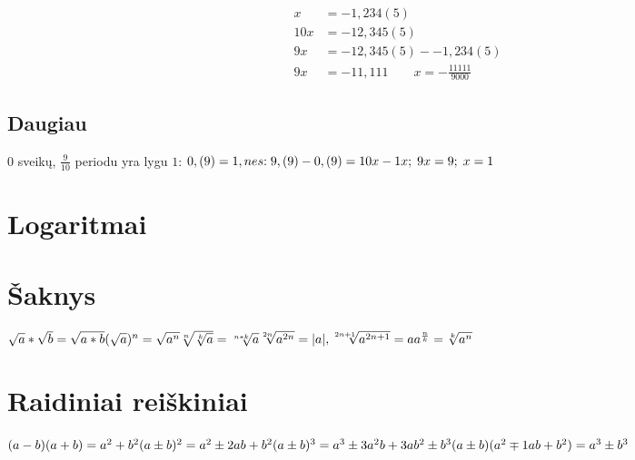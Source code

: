 \documentclass[fleqn]{article} %
\begin{document}
\begin{align*}
    x   &= -1,234(5)              \\
    10x &= -12,345(5)             \\
    9x  &= -12,345(5) - -1,234(5) \\
    9x  &= -11,111  \qquad  x = -\frac{11111}{9000}
\end{align*}  

\subsection{Daugiau}
$0$ sveikų, $\frac{9}{10}$ periodu yra lygu $1$:
\begin{math}\\
    0,(9) = 1, nes{:}\; 9,(9) - 0,(9) = 10x - 1x;\; 9x = 9;\; x = 1
\end{math}

\section{Logaritmai}

% 

\section{Šaknys}

\begin{math}
    \sqrt{a} * \sqrt{b} = \sqrt{a * b} \\
    (\sqrt{a})^n = \sqrt{a^n} \\
    \sqrt[n]{\sqrt[k]{a}} = \sqrt[n * k]{a} \\
    \sqrt[2n]{a^{2n}} = |a|, \sqrt[2n + 1]{a^{2n + 1}} = a \\
    a^{\frac{n}{k}} = \sqrt[k]{a^n}
\end{math}

\section{Raidiniai reiškiniai}

\begin{math}
    (a - b)(a + b) = a^2 + b^2 \\
    (a \pm b)^2 = a^2 \pm 2ab + b^2 \\
    (a \pm b)^3 = a^3 \pm 3a^2b + 3ab^2 \pm b^3 \\
    (a \pm b)(a^2 \mp 1ab + b^2) = a^3 \pm b^3
\end{math}
\end{document}
